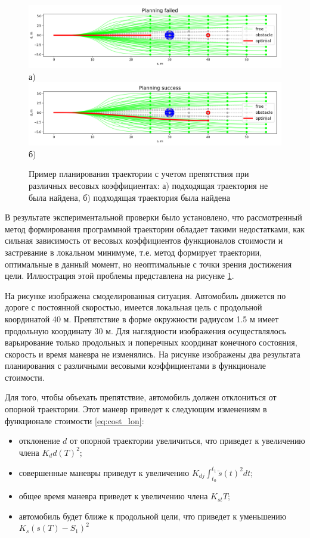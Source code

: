 \begin{figure}[h]
    \centering
    \includegraphics[width=\linewidth]{images/quintic_planning_failed} \\ а)
    \includegraphics[width=\linewidth]{images/quintic_planning_success} \\ б)
    \caption{Пример планирования траектории с учетом препятствия при различных весовых коэффициентах:
    а) подходящая траектория не была найдена, б) подходящая траектория была найдена}
    \label{img:quintic_planning_failed}
\end{figure}

В результате экспериментальной проверки было установлено, что рассмотренный метод формирования программной траектории
обладает такими недостатками, как сильная зависимость от весовых коэффициентов функционалов стоимости и застревание
в локальном минимуме, т.е. метод формирует траектории, оптимальные в данный момент, но неоптимальные с точки зрения
достижения цели. Иллюстрация этой проблемы представлена на рисунке \ref{img:quintic_planning_failed}.

На рисунке изображена смоделированная ситуация. Автомобиль движется по дороге с постоянной скоростью, имеется локальная
цель с продольной координатой 40 м. Препятствие в форме окружности радиусом 1.5 м имеет продольную координату 30 м.
Для наглядности изображения осуществлялось варьирование только продольных и поперечных координат конечного состояния,
скорость и время маневра не изменялись. На рисунке изображены два результата планирования с различными весовыми
коэффициентами в функционале стоимости.

Для того, чтобы объехать препятствие, автомобиль должен отклониться от опорной траектории. Этот маневр приведет
к следующим изменениям в функционале стоимости \ref{eq:cost_lon}:
\begin{itemize}
      \item отклонение $d$ от опорной траектории увеличиться, что приведет к увеличению члена $K_dd(T)^2$;
      \item совершенные маневры приведут к увеличению $K_{dj}\int_{t_0}^{t_1}{\dddot{s}(t)^2dt}$;
      \item общее время маневра приведет к увеличению члена $K_{st}T$;
      \item автомобиль будет ближе к продольной цели, что приведет к уменьшению $K_s(s(T)-S_1)^2$
\end{itemize}

